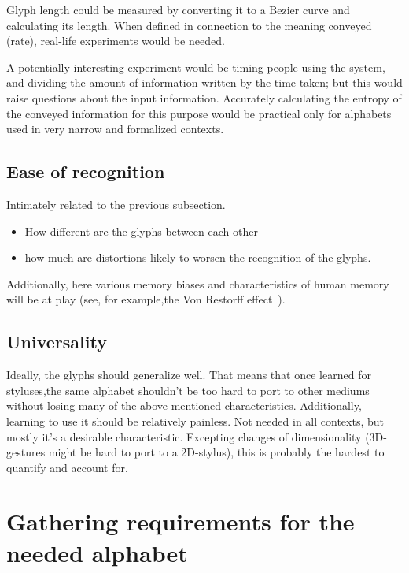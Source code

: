\documentclass{vgtc}                          %
\begin{document}
Glyph length could be measured by converting it to a Bezier curve and calculating its length. When defined in connection to the meaning conveyed (rate), real-life experiments would be needed. 

A potentially interesting experiment would be timing people using the system, and dividing the amount of information written by the time taken; but this would raise questions about the input information. Accurately calculating the entropy of the conveyed information for this purpose would be practical only for alphabets used in very narrow and formalized contexts.

\subsection{Ease of recognition}

Intimately related to the previous subsection.

\begin{itemize} 
        \item How different are the glyphs between each other
        \item how much are distortions likely to worsen the recognition of the glyphs.
\end{itemize}

Additionally,  here various memory biases and characteristics of human memory will be at play (see, for example,the Von Restorff effect~\cite{hunt1995subtlety}).

\subsection{Universality}

Ideally, the glyphs should generalize well. That means that once learned for styluses,the same alphabet shouldn't be too hard to port to other mediums without losing many of the above mentioned characteristics. Additionally, learning to use it should be relatively painless. Not needed in all contexts, but mostly it's a desirable characteristic. Excepting changes of dimensionality (3D-gestures might be hard to port to a 2D-stylus), this is probably the hardest to quantify and account
for.

\section{Gathering requirements for the needed alphabet}
\end{document}
